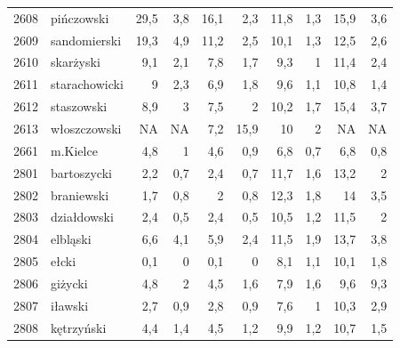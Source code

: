 \begin{center}
\begin{longtable}{lp{3cm}rrrrrrrr}
2608 & pińczowski              & 29,5    & 3,8         & 16,1     & 2,3          & 11,8     & 1,3          & 15,9     & 3,6          \\
2609 & sandomierski            & 19,3    & 4,9         & 11,2     & 2,5          & 10,1     & 1,3          & 12,5     & 2,6          \\
2610 & skarżyski               & 9,1     & 2,1         & 7,8      & 1,7          & 9,3      & 1            & 11,4     & 2,4          \\
2611 & starachowicki           & 9       & 2,3         & 6,9      & 1,8          & 9,6      & 1,1          & 10,8     & 1,4          \\
2612 & staszowski              & 8,9     & 3           & 7,5      & 2            & 10,2     & 1,7          & 15,4     & 3,7          \\
2613 & włoszczowski            & NA      & NA          & 7,2      & 15,9         & 10       & 2            & NA       & NA           \\
2661 & m.Kielce                & 4,8     & 1           & 4,6      & 0,9          & 6,8      & 0,7          & 6,8      & 0,8          \\
2801 & bartoszycki             & 2,2     & 0,7         & 2,4      & 0,7          & 11,7     & 1,6          & 13,2     & 2            \\
2802 & braniewski              & 1,7     & 0,8         & 2        & 0,8          & 12,3     & 1,8          & 14       & 3,5          \\
2803 & działdowski             & 2,4     & 0,5         & 2,4      & 0,5          & 10,5     & 1,2          & 11,5     & 2            \\
2804 & elbląski                & 6,6     & 4,1         & 5,9      & 2,4          & 11,5     & 1,9          & 13,7     & 3,8          \\
2805 & ełcki                   & 0,1     & 0           & 0,1      & 0            & 8,1      & 1,1          & 10,1     & 1,8          \\
2806 & giżycki                 & 4,8     & 2           & 4,5      & 1,6          & 7,9      & 1,6          & 9,6      & 9,3          \\
2807 & iławski                 & 2,7     & 0,9         & 2,8      & 0,9          & 7,6      & 1            & 10,3     & 2,9          \\
2808 & kętrzyński              & 4,4     & 1,4         & 4,5      & 1,2          & 9,9      & 1,2          & 10,7     & 1,5          \\

\end{longtable}
\end{center}
